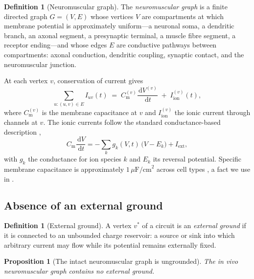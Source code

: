\documentclass[11pt,twocolumn,a4paper]{article}
\theoremstyle{thmstyle}
\newtheorem{proposition}[theorem]{Proposition}
\theoremstyle{definition}
\newtheorem{definition}[theorem]{Definition}
\theoremstyle{remark}
\newcommand{\Gph}{G}
\newcommand{\V}{V}
\newcommand{\E}{E}
\newcommand{\dd}{\,\mathrm{d}}
\begin{document}
\begin{definition}[Neuromuscular graph]
\label{def:nm-graph}
The \emph{neuromuscular graph} is a finite directed graph
$\Gph=(\V,\E)$ whose vertices $\V$ are compartments at which membrane
potential is approximately uniform---a neuronal soma, a dendritic branch, an
axonal segment, a presynaptic terminal, a muscle fibre segment, a receptor
ending---and whose edges $\E$ are conductive pathways between compartments:
axonal conduction, dendritic coupling, synaptic contact, and the neuromuscular
junction.
\end{definition}

At each vertex $v$, conservation of current gives
\begin{equation}
\sum_{u:(u,v)\in\E} I_{uv}(t)
\;=\; C_{\mathrm{m}}^{(v)}\frac{\dd V^{(v)}}{\dd t}
\;+\; I_{\mathrm{ion}}^{(v)}(t),
\label{eq:kcl}
\end{equation}
where $C_{\mathrm{m}}^{(v)}$ is the membrane capacitance at $v$ and
$I_{\mathrm{ion}}^{(v)}$ the ionic current through channels at $v$. The ionic
currents follow the standard conductance-based description
\citep{hodgkin1952},
\begin{equation}
C_{\mathrm{m}}\frac{\dd V}{\dd t}
= -\sum_k g_k(V,t)\,\bigl(V-E_k\bigr) + I_{\mathrm{ext}},
\label{eq:hh}
\end{equation}
with $g_k$ the conductance for ion species $k$ and $E_k$ its reversal
potential. Specific membrane capacitance is approximately
$1\,\mu\mathrm{F/cm}^2$ across cell types
\citep{cole1941,gentet2000}, a fact we use in .

\subsection{Absence of an external ground}

\begin{definition}[External ground]
\label{def:ground}
A vertex $v^\ast$ of a circuit is an \emph{external ground} if it is connected
to an unbounded charge reservoir: a source or sink into which arbitrary
current may flow while its potential remains externally fixed.
\end{definition}

\begin{proposition}[The intact neuromuscular graph is ungrounded]
\label{prop:no-ground}
The \emph{in vivo} neuromuscular graph contains no external ground.
\end{proposition}
\end{document}
